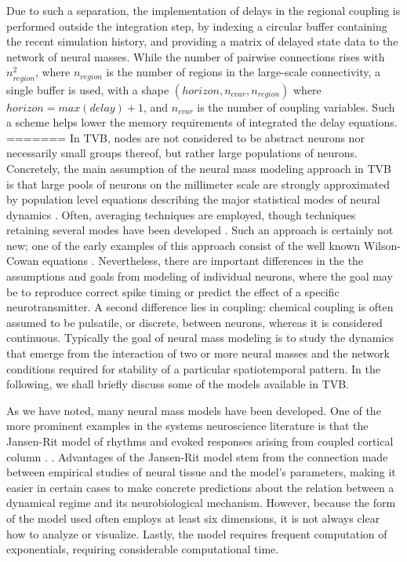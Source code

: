 	Due to such a separation, the implementation of delays in the
	regional coupling is performed outside the integration step,
	by indexing a circular buffer containing the recent simulation 
	history, and providing a matrix of delayed state data to the 
	network of neural masses. While the number of pairwise
	connections rises with $n_{region}^2$, where $n_{region}$ is
	the number of regions in the large-scale connectivity, 
	a single buffer is used, with a shape
	$(horizon, n_{cvar}, n_{region})$ where $horizon = max(delay) + 1$,
	and
	$n_{cvar}$ is the number of coupling variables. Such a scheme helps 
	lower the memory requirements of integrated the delay equations.
=======
    In TVB, nodes are not considered to be abstract neurons nor necessarily
    small groups thereof, but rather large populations of neurons. Concretely,
    the main assumption of the neural mass modeling approach in TVB is that
    large pools of neurons on the millimeter scale are strongly approximated
    by population level equations describing the major statistical modes of
    neural dynamics \cite{Freeman_1975book}. Often, averaging techniques are
    employed, though techniques retaining several modes have been developed
    \cite{Stefanescu_2008, Stefanescu_2011}. Such an approach is certainly not
    new; one of the early examples of this approach consist of the well known
    Wilson-Cowan equations \cite{Wilson_1973}. Nevertheless, there are
    important differences in the the assumptions and goals from modeling of
    individual neurons, where the goal may be to reproduce correct spike
    timing or predict the effect of  a specific neurotransmitter. A second
    difference lies in coupling: chemical coupling is often assumed to be
    pulsatile, or discrete, between neurons, whereas it is considered
    continuous. Typically the goal of neural mass modeling is to study the
    dynamics that emerge from the interaction of two or more neural masses and
    the network conditions required for stability of a particular
    spatiotemporal pattern. In the following, we shall  briefly discuss some
    of the models available in TVB.

    As we have noted, many neural mass models have been developed. One of
    the more prominent examples in the systems neuroscience literature is 
    that the Jansen-Rit model of rhythms and evoked responses arising from
    coupled cortical column \cite{Zetterberg_1978, Jansen_1995, Spiegler_2010}. 
    .
    Advantages of the Jansen-Rit model stem from the connection made
    between empirical studies of neural tissue and the model's parameters, 
    making it easier in certain cases to make concrete predictions about
    the relation between a dynamical regime and its neurobiological 
    mechanism. However, because the form of the model used often employs
    at least six dimensions, it is not always clear how to analyze or
    visualize. Lastly, the model requires frequent computation of exponentials,
    requiring considerable computational time. 

